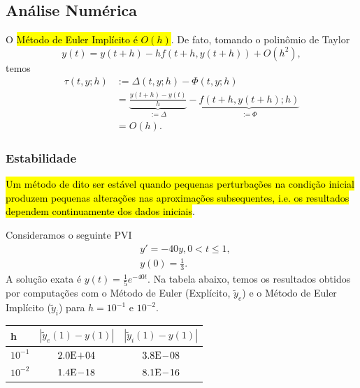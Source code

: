 \subsection{Análise Numérica}

O \hl{Método de Euler Implícito é $O(h)$}. De fato, tomando o polinômio de Taylor
\begin{equation}
  y(t) = y(t+h) -hf\left(t+h, y(t+h)\right) + O(h^2),
\end{equation}
temos
\begin{align}
  \tau(t, y; h) &:= \Delta(t,y; h) - \Phi(t, y; h) \\
                &= \underbrace{\frac{y(t+h) - y(t)}{h}}_{:= \Delta} - \underbrace{f(t+h, y(t+h); h)}_{:= \Phi}\\
                &= O(h).
\end{align}

\subsubsection{Estabilidade}

\hl{Um método de dito ser estável quando pequenas perturbações na condição inicial produzem pequenas alterações nas aproximações subsequentes, i.e. os resultados dependem continuamente dos dados iniciais}.

\begin{ex}
  Consideramos o seguinte PVI
  \begin{subequations}
    \begin{align}
      &y' = -40y, 0 < t \leq 1,\\
      &y(0) = \frac{1}{3}.
    \end{align}
  \end{subequations}
  A solução exata é $y(t) = \frac{1}{5}e^{-40t}$. Na tabela abaixo, temos os resultados obtidos por computações com o Método de Euler (Explícito, $\tilde{y}_e$) e o Método de Euler Implícito ($\tilde{y}_i$) para $h = 10^{-1}$ e $10^{-2}$.

  \begin{center}
    \begin{tabular}{lcc}
      h & $\left|\tilde{y}_e(1) - y(1)\right|$ & $\left|\tilde{y}_i(1) - y(1)\right|$ \\\hline
      $10^{-1}$ & $2.0\mathrm{E}\!+\!04$ & $3.8\mathrm{E}\!-\!08$ \\
      $10^{-2}$ & $1.4\mathrm{E}\!-\!18$ & $8.1\mathrm{E}\!-\!16$ \\\hline
    \end{tabular}
  \end{center}
\end{ex}


